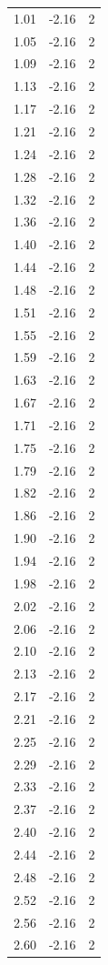 \begin{longtable}{lrr}
  1.01 & -2.16 & 2 \\
  1.05 & -2.16 & 2 \\
  1.09 & -2.16 & 2 \\
  1.13 & -2.16 & 2 \\
  1.17 & -2.16 & 2 \\
  1.21 & -2.16 & 2 \\
  1.24 & -2.16 & 2 \\
  1.28 & -2.16 & 2 \\
  1.32 & -2.16 & 2 \\
  1.36 & -2.16 & 2 \\
  1.40 & -2.16 & 2 \\
  1.44 & -2.16 & 2 \\
  1.48 & -2.16 & 2 \\
  1.51 & -2.16 & 2 \\
  1.55 & -2.16 & 2 \\
  1.59 & -2.16 & 2 \\
  1.63 & -2.16 & 2 \\
  1.67 & -2.16 & 2 \\
  1.71 & -2.16 & 2 \\
  1.75 & -2.16 & 2 \\
  1.79 & -2.16 & 2 \\
  1.82 & -2.16 & 2 \\
  1.86 & -2.16 & 2 \\
  1.90 & -2.16 & 2 \\
  1.94 & -2.16 & 2 \\
  1.98 & -2.16 & 2 \\
  2.02 & -2.16 & 2 \\
  2.06 & -2.16 & 2 \\
  2.10 & -2.16 & 2 \\
  2.13 & -2.16 & 2 \\
  2.17 & -2.16 & 2 \\
  2.21 & -2.16 & 2 \\
  2.25 & -2.16 & 2 \\
  2.29 & -2.16 & 2 \\
  2.33 & -2.16 & 2 \\
  2.37 & -2.16 & 2 \\
  2.40 & -2.16 & 2 \\
  2.44 & -2.16 & 2 \\
  2.48 & -2.16 & 2 \\
  2.52 & -2.16 & 2 \\
  2.56 & -2.16 & 2 \\
  2.60 & -2.16 & 2 \\

\end{longtable}

